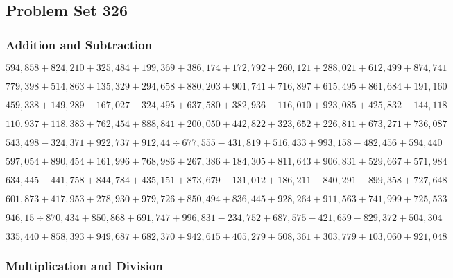\hypertarget{problem-set-326}{%
\subsection{Problem Set 326}\label{problem-set-326}}

\hypertarget{addition-and-subtraction}{%
\subsubsection{Addition and
Subtraction}\label{addition-and-subtraction}}

\(594,858+824,210+325,484+199,369+386,174+172,792+260,121+288,021+612,499+874,741\)

\(779,398+514,863+135,329+294,658+880,203+901,741+716,897+615,495+861,684+191,160\)

\(459,338+149,289-167,027-324,495+637,580+382,936-116,010+923,085+425,832-144,118\)

\(110,937+118,383+762,454+888,841+200,050+442,822+323,652+226,811+673,271+736,087\)

\(543,498-324,371+922,737+912,44÷677,555-431,819+516,433+993,158-482,456+594,440\)

\(597,054+890,454+161,996+768,986+267,386+184,305+811,643+906,831+529,667+571,984\)

\(634,445-441,758+844,784+435,151+873,679-131,012+186,211-840,291-899,358+727,648\)

\(601,873+417,953+278,930+979,726+850,494+836,445+928,264+911,563+741,999+725,533\)

\(946,15÷870,434+850,868+691,747+996,831-234,752+687,575-421,659-829,372+504,304\)

\(335,440+858,393+949,687+682,370+942,615+405,279+508,361+303,779+103,060+921,048\)

\hypertarget{multiplication-and-division}{%
\subsubsection{Multiplication and
Division}\label{multiplication-and-division}}

